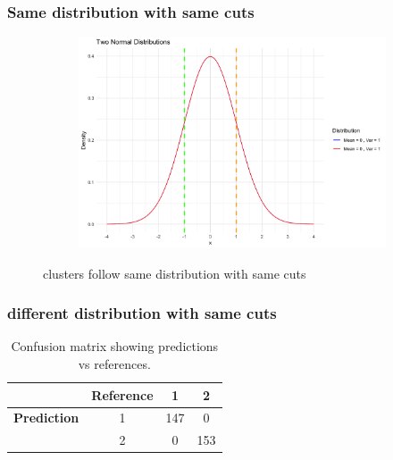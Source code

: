 \documentclass{article}
\begin{document}
\subsubsection*{Same distribution with same cuts}
\begin{figure}[h]
  \centering
  \begin{subfigure}{0.8\textwidth}
      \centering
      \includegraphics[width=\textwidth]{images/dist_simu/4-0_1.png}
  \end{subfigure}
  \caption{clusters follow same distribution with same cuts}
  \label{fig:same_dist}
\end{figure}

\subsubsection*{different distribution with same cuts}

\begin{table}[h]
  \centering
  \begin{tabular}{c|c|c|c}
            & \textbf{Reference} & 1 & 2 \\
  \hline
  \textbf{Prediction} & 1 & 147 & 0 \\
                      & 2 & 0 & 153 \\
  \end{tabular}
  \caption{Confusion matrix showing predictions vs references.}
  \label{tab:confusion_matrix}
  \end{table}
  
  \vspace{0.5cm} %
  
\end{document}
